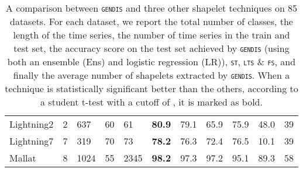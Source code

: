 \documentclass[runningheads]{llncs}
\begin{document}
\begin{table}[t]
\begin{tabular}{>{\tiny}lllll|lllll|l}
		Lightning2                   & 2         & 637       & 60      & 61     & \textbf{80.9} & 79.1 & 65.9          & 75.9          & 48.0 & 39          \\
		Lightning7                   & 7         & 319       & 70      & 73     & \textbf{78.2} & 76.3          & 72.4          & 76.5          & 10.1 & 39          \\
		Mallat                       & 8         & 1024      & 55      & 2345   & \textbf{98.2} & 97.3 & 97.2          & 95.1          & 89.3 & 58          \\
		
		\bottomrule
	\end{tabular}
	\caption{A comparison between \textsc{\texttt{gendis}} and three other shapelet techniques on 85 datasets. For each dataset, we report the total number of classes, the length of the time series, the number of time series in the train and test set, the accuracy score on the test set achieved by \textsc{\texttt{gendis}} (using both an ensemble (Ens) and logistic regression (LR)), \textsc{\texttt{st}}, \textsc{\texttt{lts}} \& \textsc{\texttt{fs}}, and finally the average number of shapelets extracted by \textsc{\texttt{gendis}}. When a technique is statistically significant better than the others, according to a student t-test with a cutoff of , it is marked as bold.}
	\label{tbl:gendis_all_1}
\end{table}
\end{document}
